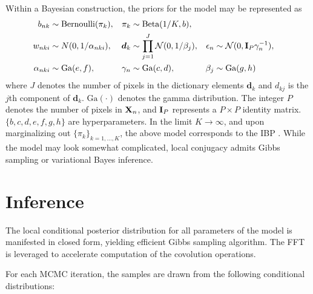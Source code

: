 \documentclass{article} %
\newcommand{\Imat}{{\bf I}}
\newcommand{\Xmat}[0]{{{\bf X}}}
\newcommand{\dv}{\boldsymbol{d}}
\newcommand{\Ncal}{\mathcal{N}}
\begin{document}
Within a Bayesian construction, the priors for the model may be represented as 
%
\begin{align}
b_{nk} &\sim \mbox{Bernoulli} (\pi_k), &  \pi_k &\sim \mbox{Beta} (1/K,b), \\
w_{nki} &\sim N (0,1/\alpha_{nki}), & \dv_k &\sim \prod_{j=1}^J \Ncal(0,1/\beta_j), & \epsilon_n &\sim \Ncal(0,\Imat_P \gamma_{n}^{-1}), \\
\alpha_{nki} &\sim \mbox{Ga} (e,f), & \gamma_n &\sim \mbox{Ga} (c,d), & \beta_j &\sim \mbox{Ga} (g,h)
\end{align}
%
where $J$ denotes the number of pixels in the dictionary elements $\dv_k$ and $d_{kj}$ is the $j$th component of $\dv_k$. $\mbox{Ga}(\cdot)$ denotes the gamma distribution. The integer $P$ denotes the number of pixels in $\Xmat_n$, and $\Imat_P$ represents a $P \times P$ identity matrix. $\{b,c,d,e,f,g,h\}$ are hyperparameters. In the limit $K \rightarrow \infty$, and upon marginalizing out $\{\pi_k\}_{k=1,\ldots,K}$, the above model corresponds to the IBP \cite{griffiths2005infinite} \cite{thibaux2007hierarchical}. While the model may look somewhat complicated, local conjugacy admits Gibbs sampling or variational Bayes inference.

\section{Inference}
%
The local conditional posterior distribution for all parameters of the model is manifested in closed form, yielding efficient Gibbs sampling algorithm. The FFT is leveraged to accelerate computation of the covolution operations.

For each MCMC iteration, the samples are drawn from the following conditional distributions:
\end{document}
